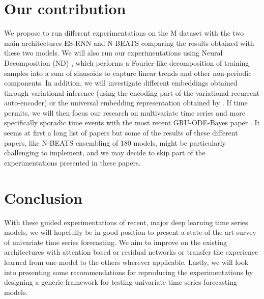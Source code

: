\documentclass{article}
\begin{document}
\section{Our contribution}

We propose to run different experimentations on the M dataset with the two main architectures ES-RNN and N-BEATS comparing the results obtained with these two models.
We will also run our experimentations using Neural Decomposition (ND) \cite{NeuralDecomposition}, which performs a Fourier-like decomposition of training samples into a sum of sinusoids to capture linear trends and other non-periodic components. 
In addition, we will investigate different embeddings obtained through variational inference (using the encoding part of the variational recurrent auto-encoder) or the universal embedding representation obtained by \cite{Franceschi}.
If time permits, we will then focus our research on multivariate time series and more specifically sporadic time events with the most recent GRU-ODE-Bayes paper \cite{GRUODEBayes}. 
It seems at first a long list of papers but some of the results of these different papers, like  N-BEATS ensembling of 180 models, might be particularly challenging to implement, and we may decide to skip part of the experimentations presented
in these papers.

\section{Conclusion}
With these guided experimentations of recent, major deep learning time series models, we will hopefully be in good position to present a state-of-the art survey of univariate time series forecasting.
We aim to improve on the existing architectures with attention based or residual networks or transfer the experience learned from one model to the others wherever applicable. Lastly, we will look into 
presenting some recommendations for reproducing the experimentations by designing a generic framework for testing univariate time series forecasting models. 

 

\end{document}
